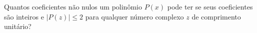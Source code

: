 Quantos coeficientes não nulos um polinômio \( P(x) \) pode ter se seus coeficientes são inteiros e \( |P(z)| \le 2 \) para qualquer número complexo \( z \) de comprimento unitário?
